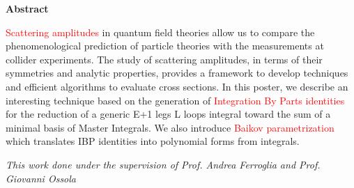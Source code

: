 \documentclass[10pt]{article}
\begin{document}
\textbf{Abstract}

\textcolor{red}{Scattering amplitudes} in quantum field theories allow us to compare the phenomenological prediction of particle theories with the measurements at collider experiments.
The study of scattering amplitudes, in terms of their symmetries and analytic properties, provides a framework to develop techniques and efficient algorithms to evaluate cross sections.
In this poster, we describe an interesting technique based on the generation of \textcolor{red}{Integration By Parts identities} for the reduction of a generic E+1 legs L loops integral toward the sum of a minimal basis of Master Integrals.
We also introduce \textcolor{red}{Baikov parametrization} which translates IBP identities into polynomial forms from integrals.

\textit{This work done under the supervision of Prof. Andrea Ferroglia and Prof. Giovanni Ossola}
\end{document}
